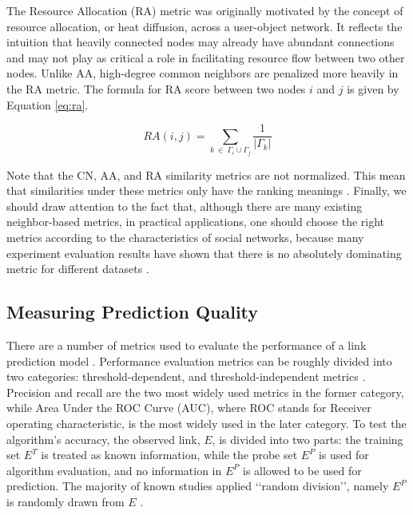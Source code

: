 The Resource Allocation (RA) \cite{zhou2010solving} metric was originally motivated by the concept of resource allocation, or heat diffusion, across a user-object network. It reflects the intuition that heavily connected nodes may already have abundant connections and may not play as critical a role in facilitating resource flow between two other nodes. Unlike AA, high-degree common neighbors are penalized more heavily in the RA metric. The formula for RA score between two nodes $i$ and $j$ is given by Equation \ref{eq:ra}.

\begin{equation}
\label{eq:ra}
  RA(i, j) = \sum_{k\ \in\ \Gamma_i \cup \Gamma_j} \frac{1}{|\Gamma_k|}
\end{equation}

Note that the CN, AA, and RA similarity metrics are not normalized. This mean that similarities under these metrics only have the ranking meanings \cite{wang2014link}. Finally, we should draw attention to the fact that, although there are many existing neighbor-based metrics, in practical applications, one should choose the right metrics according to the characteristics of social networks, because many experiment evaluation results have shown that there is no absolutely dominating metric for different datasets \cite{liben2003link, wang2014link, zhou2021progresses}.




\subsection{Measuring Prediction Quality}

There are a number of metrics used to evaluate the performance of a link prediction model \cite{arrar2023comprehensive}. Performance evaluation metrics can be roughly divided into two categories: threshold-dependent, and threshold-independent metrics \cite{zhou2021progresses}. Precision and recall are the two most widely used metrics in the former category, while Area Under the ROC Curve (AUC), where ROC stands for Receiver operating characteristic, is the most widely used in the later category. To test the algorithm’s accuracy, the observed link, $E$, is divided into two parts: the training set $E^T$ is treated as known information, while the probe set $E^P$ is used for algorithm evaluation, and no information in $E^P$ is allowed to be used for prediction. The majority of known studies applied ‘‘random division’’, namely $E^P$ is randomly drawn from $E$ \cite{zhou2021progresses}.

